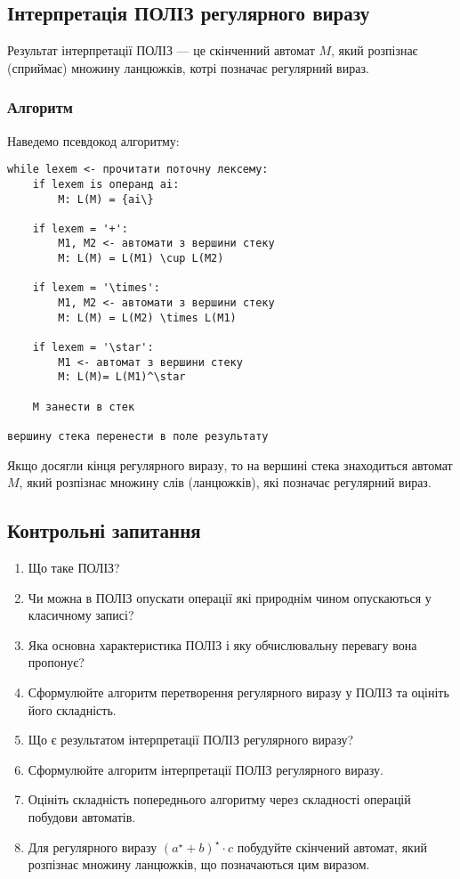 \subsection{Інтерпретація ПОЛІЗ регулярного виразу}

Результат інтерпретації ПОЛІЗ --- це скінченний автомат $M$, який розпізнає (сприймає) множину ланцюжків, котрі позначає регулярний вираз.

\subsubsection{Алгоритм}

Наведемо псевдокод алгоритму:
\begin{verbatim}
while lexem <- прочитати поточну лексему:
    if lexem is операнд ai:
        M: L(M) = {ai\}
	
    if lexem = '+':
        M1, M2 <- автомати з вершини стеку
        M: L(M) = L(M1) \cup L(M2)
		
    if lexem = '\times':
        M1, M2 <- автомати з вершини стеку
        M: L(M) = L(M2) \times L(M1)

    if lexem = '\star':
        M1 <- автомат з вершини стеку
        M: L(M)= L(M1)^\star

    M занести в стек

вершину стека перенести в поле результату
\end{verbatim}

Якщо досягли кінця регулярного виразу, то на вершині стека знаходиться автомат $M$, який розпізнає множину слів (ланцюжків), які позначає регулярний вираз.

\subsection{Контрольні запитання}

\begin{enumerate}
	\item Що таке ПОЛІЗ?
	\item Чи можна в ПОЛІЗ опускати операції які природнім чином опускаються у класичному записі? %
	\item Яка основна характеристика ПОЛІЗ і яку обчислювальну перевагу вона пропонує? %
	\item Сформулюйте алгоритм перетворення регулярного виразу у ПОЛІЗ та оцініть його складність.
	\item Що є результатом інтерпретації ПОЛІЗ регулярного виразу? %
	\item Сформулюйте алгоритм інтерпретації ПОЛІЗ регулярного виразу.
	\item Оцініть складність попереднього алгоритму через складності операцій побудови автоматів.
	\item Для регулярного виразу $(a^\star + b)^\star \cdot c$ побудуйте скінчений автомат, який розпізнає множину ланцюжків, що позначаються цим виразом.
\end{enumerate}
